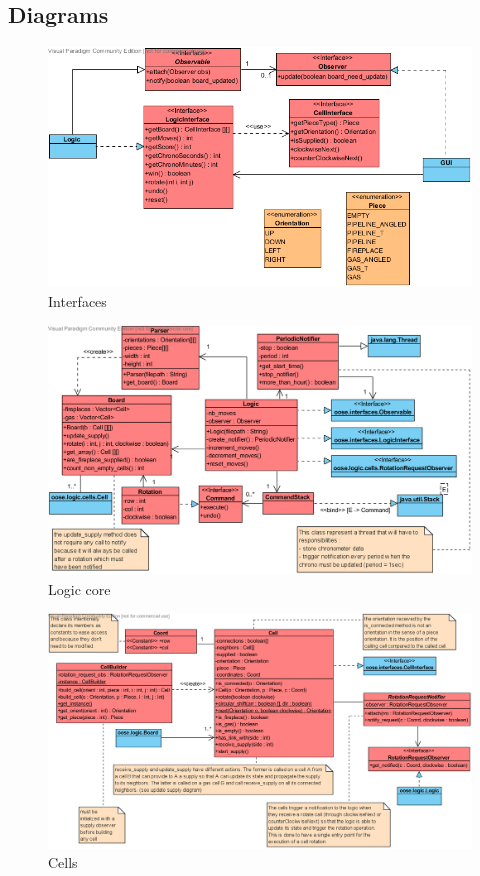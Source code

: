 \documentclass[a4paper,11pt]{article}
\begin{document}
\subsection{Diagrams}
\begin{figure}[h]
	\center
	\includegraphics[angle=90,scale=1]{interfaces.png}
	\caption{Interfaces}
	\label{fig:inter}
\end{figure}
\begin{figure}[h]
	\center
	\includegraphics[angle=90,scale=1]{logic.png}
	\caption{Logic core}
	\label{fig:logic}
\end{figure}
\begin{figure}[h]
	\center
	\includegraphics[angle=90,scale=1]{cells.png}
	\caption{Cells}
	\label{fig:cells}
\end{figure}
\end{document}
